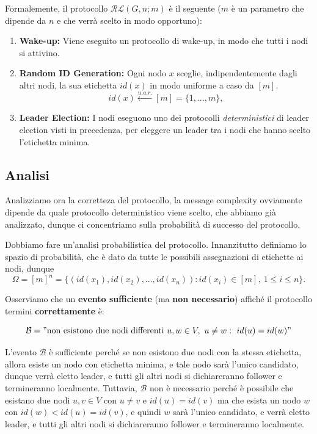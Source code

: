 Formalemente, il protocollo $\mathcal{RL}(G, n; m)$ è il seguente ($m$ è un parametro che dipende da $n$ e che verrà scelto in modo opportuno):
\begin{enumerate}
    \item \textbf{Wake-up:} Viene eseguito un protocollo di wake-up, in modo che tutti i nodi si attivino.
    \item \textbf{Random ID Generation:} Ogni nodo $x$ sceglie, indipendentemente dagli altri nodi, la sua etichetta $id(x)$ in modo uniforme a caso da $[m]$.
    \[
        id(x) \xleftarrow{u.a.r.} [m] = \{1, \dots, m\},
    \]
    \item \textbf{Leader Election:} I nodi eseguono uno dei protocolli \textit{deterministici} di leader election visti in precedenza, per eleggere un leader tra i nodi che hanno scelto l'etichetta minima.
\end{enumerate}

\subsection{Analisi}

Analizziamo ora la corretteza del protocollo, la message complexity ovviamente dipende da quale protocollo deterministico viene scelto, che abbiamo già analizzato, dunque ci concentriamo sulla probabilità di successo del protocollo.

Dobbiamo fare un'analisi probabilistica del protocollo. Innanzitutto definiamo lo spazio di probabilità, che è dato da tutte le possibili assegnazioni di etichette ai nodi, dunque
\[
    \Omega = [m]^n = \{(id(x_1), id(x_2), \ldots, id(x_n)) : id(x_i) \in [m],\ 1 \leq i \leq n\}.
\]

Osserviamo che un \textbf{evento sufficiente} (ma \textbf{non necessario}) affiché il protocollo termini \textbf{correttamente} è:

\[
    \mathcal{B} = "\text{non esistono due nodi differenti } u, w \in V,\ u \neq w:\ id(u) = id(w)"
\]

L'evento $\mathcal{B}$ è sufficiente perché se non esistono due nodi con la stessa etichetta, allora esiste un nodo con etichetta minima, e tale nodo sarà l'unico candidato, dunque verrà eletto leader, e tutti gli altri nodi si dichiareranno follower e termineranno localmente. Tuttavia, $\mathcal{B}$ non è necessario perché è possibile che esistano due nodi $u, v \in V$ con $u \neq v$ e $id(u) = id(v)$ ma che esista un nodo $w$ con $id(w) < id(u) = id(v)$, e quindi $w$ sarà l'unico candidato, e verrà eletto leader, e tutti gli altri nodi si dichiareranno follower e termineranno localmente.

